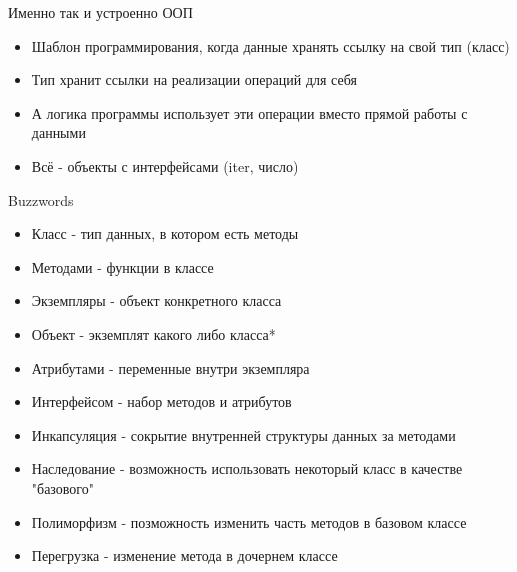 \documentclass{article}
\begin{document}
\begin{center} Именно так и устроенно ООП \end{center}
\begin{itemize}
    \item Шаблон программирования, когда данные хранять ссылку на свой тип (класс)
    \item Тип хранит ссылки на реализации операций для себя
    \item А логика программы использует эти операции вместо прямой работы с данными
    \item Всё - объекты с интерфейсами (iter, число)
\end{itemize}
\newpage

\begin{center} Buzzwords \end{center}
\begin{itemize}
    \item Класс - тип данных, в котором есть методы
    \item Методами - функции в классе
    \item Экземпляры - объект конкретного класса
    \item Объект - экземплят какого либо класса*
    \item Атрибутами  - переменные внутри экземпляра
    \item Интерфейсом - набор методов и атрибутов
    \item Инкапсуляция - сокрытие внутренней структуры данных за методами
    \item Наследование - возможность использовать некоторый класс в качестве "базового"
    \item Полиморфизм - позможность изменить часть методов в базовом классе
    \item Перегрузка - изменение метода в дочернем классе
\end{itemize}
\newpage
\end{document}
